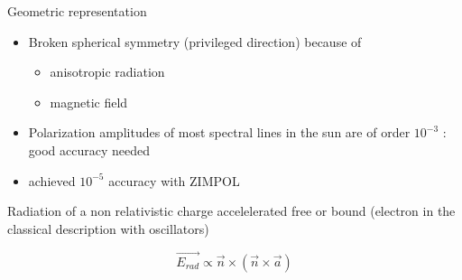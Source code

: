 \documentclass{beamer}
\begin{document}
\newcommand{\tikzAngleOfLine}{\tikz@AngleOfLine}
  \def\tikz@AngleOfLine(#1)(#2)#3{%
  \pgfmathanglebetweenpoints{%
    \pgfpointanchor{#1}{center}}{%
    \pgfpointanchor{#2}{center}}
  \pgfmathsetmacro{#3}{\pgfmathresult}%
  }



\begin{frame}{Geometric representation}

\begin{itemize}
\item Broken spherical symmetry (privileged direction) because of

\begin{itemize}
\item anisotropic radiation 

\item magnetic field

\end{itemize}

\item Polarization amplitudes of most spectral lines in the sun are of order $10^{-3}$ : good accuracy needed

\item achieved $10^{-5}$ accuracy with ZIMPOL
\end{itemize}

Radiation of a non relativistic charge accelelerated free or bound 
(electron in the classical description with oscillators) 


\begin{equation}
	\vec{E_{rad}} \propto  \vec{n} \times (\vec{n} \times \vec{a}) 
\end{equation}



\end{frame}
\end{document}
